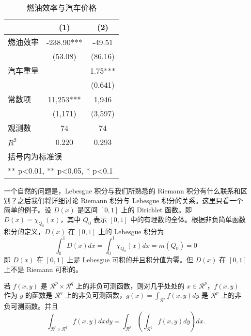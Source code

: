 \documentclass[cn,pad,11pt,green,geye]{../elegantnote}
\begin{document}
\begin{table}[htbp]
  \small
  \centering
  \caption{燃油效率与汽车价格}
    \begin{tabular}{lcc}
    \toprule
                    &       (1)         &        (2)      \\
    \midrule
    燃油效率        &    -238.90***     &      -49.51     \\
                    &     (53.08)       &      (86.16)    \\
    汽车重量        &                   &        1.75***  \\
                    &                   &       (0.641)   \\
    常数项          &  11,253***        &    1,946       \\
                    &  (1,171)          &   (3,597)      \\
    观测数          &      74           &       74        \\
    $R^2$           &       0.220       &        0.293    \\
    \bottomrule
    \multicolumn{3}{l}{\scriptsize 括号内为标准误} \\
    \multicolumn{3}{l}{\scriptsize *** p<0.01, ** p<0.05, * p<0.1} \\
    \end{tabular}%
  \label{tab:reg}%
\end{table}%

一个自然的问题是，Lebesgue 积分与我们所熟悉的 Riemann 积分有什么联系和区别？之后我们将详细讨论 Riemann 积分与 Lebesgue 积分的关系。这里只看一个简单的例子。设 $D(x)$ 是区间 $[0,1]$ 上的 Dirichlet 函数。即 $D(x)=\chi_{Q_0}(x)$，其中 $Q_0$ 表示 $[0,1]$ 中的有理数的全体。根据非负简单函数积分的定义，$D(x)$ 在 $[0,1]$ 上的 Lebesgue 积分为
\begin{equation}
   \label{inter2}
   \int_0^1 D(x)dx = \int_0^1 \chi_{Q_0} (x) dx = m(Q_0) = 0
\end{equation}
即 $D(x)$ 在 $[0,1]$ 上是 Lebesgue 可积的并且积分值为零。但 $D(x)$ 在 $[0,1]$ 上不是 Riemann 可积的。

\begin{theorem}[Fubini 定理]\label{thm:fubi}
若 $f(x,y)$ 是 $\mathcal{R}^p\times\mathcal{R}^q$ 上的非负可测函数，则对几乎处处的 $x\in \mathcal{R}^p$，$f(x,y)$ 作为 $y$ 的函数是 $\mathcal{R}^q$ 上的非负可测函数，$g(x)=\int_{\mathcal{R}^q}f(x,y) dy$ 是 $\mathcal{R}^p$ 上的非负可测函数。并且
\begin{equation}
   \label{eq:461}
   \int_{\mathcal{R}^p\times\mathcal{R}^q} f(x,y) dxdy=\int_{\mathcal{R}^p}\left(\int_{\mathcal{R}^q}f(x,y)dy\right)dx.
\end{equation}
\end{theorem}
\end{document}

